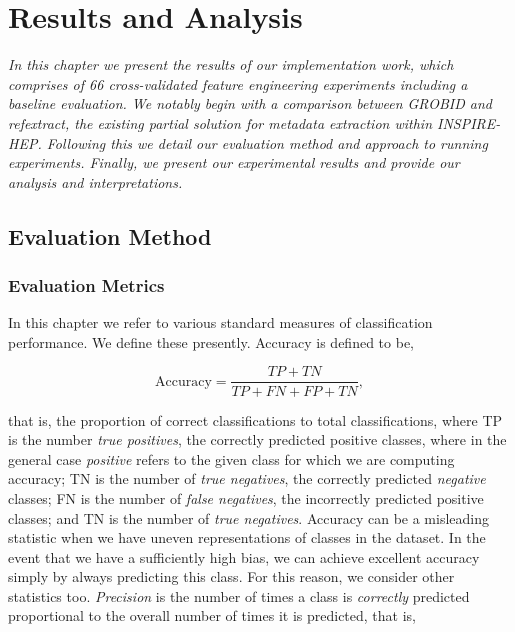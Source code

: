 
\chapter{Results and Analysis} %

\label{Chapter5} %


\emph{In this chapter we present the results of our implementation work, which comprises of 66 cross-validated feature engineering experiments including a baseline evaluation. We notably begin with a comparison between GROBID and refextract, the existing partial solution for metadata extraction within INSPIRE-HEP. Following this we detail our evaluation method and approach to running experiments. Finally, we present our experimental results and provide our analysis and interpretations.}

\section{Evaluation Method}
\subsection{Evaluation Metrics}
\label{subsec:evaluationmethod}

In this chapter we refer to various standard measures of classification performance. We define these presently. Accuracy is defined to be,

\begin{equation}
\text{Accuracy} = \frac{TP + TN}{TP + FN + FP + TN},
\label{eq:accuracy}
\end{equation}

that is, the proportion of correct classifications to total classifications, where TP is the number \emph{true positives}, the correctly predicted positive classes, where in the general case \emph{positive} refers to the given class for which we are computing accuracy; TN is the number of \emph{true negatives}, the correctly predicted \emph{negative} classes; FN is the number of \emph{false negatives}, the incorrectly predicted positive classes; and TN is the number of \emph{true negatives}. Accuracy can be a misleading statistic when we have uneven representations of classes in the dataset. In the event that we have a sufficiently high bias, we can achieve excellent accuracy simply by always predicting this class. For this reason, we consider other statistics too. \emph{Precision} is the number of times a class is \emph{correctly} predicted proportional to the overall number of times it is predicted, that is,

